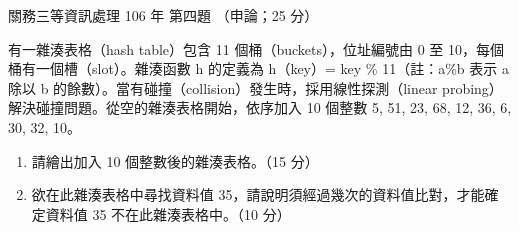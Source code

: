 \begin{pastexam}[label={px:gw3-106-ds-04}]{關務三等資訊處理 106 年 第四題}
（申論；25 分）

有一雜湊表格（hash table）包含 11 個桶（buckets），位址編號由 0 至 10，每個桶有一個槽（slot）。雜湊函數 h 的定義為
h（key）= key \% 11（註：a\%b 表示 a 除以 b 的餘數）。當有碰撞（collision）發生時，採用線性探測（linear probing）
解決碰撞問題。從空的雜湊表格開始，依序加入 10 個整數 5, 51, 23, 68, 12, 36, 6, 30, 32, 10。
\begin{enumerate}[leftmargin=2.6em, labelsep=0.4em]
\item[㈠] 請繪出加入 10 個整數後的雜湊表格。（15 分）
\item[㈡] 欲在此雜湊表格中尋找資料值 35，請說明須經過幾次的資料值比對，才能確定資料值 35 不在此雜湊表格中。（10 分）
\end{enumerate}
\end{pastexam}

